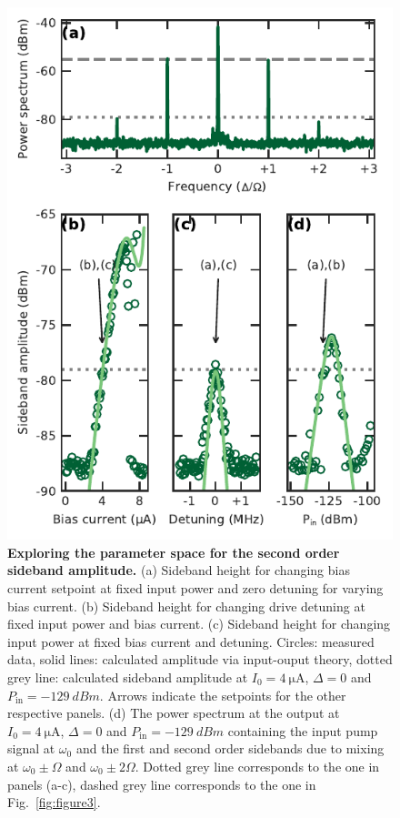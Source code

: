 \begin{figure}
	\centering
	\includegraphics[width=.5\linewidth]{chapter-currentdetection/figures/SM_second_order_peak}
	\caption{
		\textbf{Exploring the parameter space for the second order sideband amplitude.}
		(a) Sideband height for changing bias current setpoint at fixed input power and zero detuning for varying bias current.
		(b) Sideband height for changing drive detuning at fixed input power and bias current.
		(c) Sideband height for changing input power at fixed bias current and detuning.
		Circles: measured data, solid lines: calculated amplitude via input-ouput theory, dotted grey line: calculated sideband amplitude at $I_0=\SI{4}{\micro\ampere}$, $\Delta=0$ and $P_\text{in}=\SI{-129}{dBm}$.
		Arrows indicate the setpoints for the other respective panels.
		(d) The power spectrum at the output at $I_0=\SI{4}{\micro\ampere}$, $\Delta=0$ and $P_\text{in}=\SI{-129}{dBm}$ containing the input pump signal at $\omega_0$ and the first and second order sidebands due to mixing at $\omega_0 \pm \Omega$ and $\omega_0 \pm 2\Omega$.
		Dotted grey line corresponds to the one in panels (a-c), dashed grey line corresponds to the one in Fig.~\ref{fig:figure3}.
	}
	\label{fig:higher-order-peaks}
\end{figure}


%



\clearpage
\pagebreak



